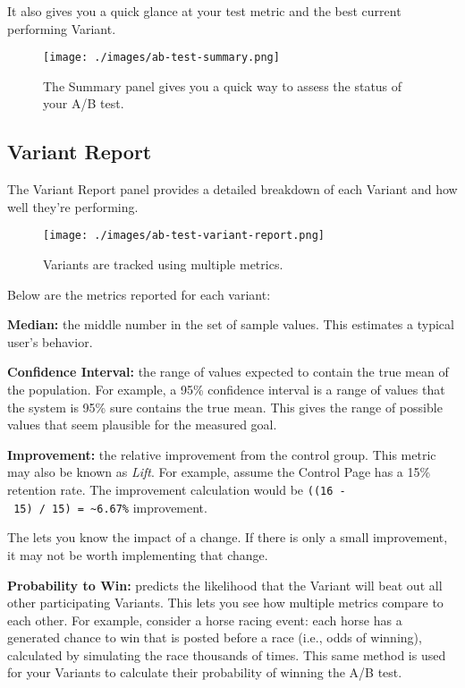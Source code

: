 It also gives you a quick glance at your test metric and the best
current performing Variant.

\begin{figure}
\centering
\texttt{[image: ./images/ab-test-summary.png]}
\caption{The Summary panel gives you a quick way to assess the status of
your A/B test.}
\end{figure}

\subsection{Variant Report}\label{variant-report}

The Variant Report panel provides a detailed breakdown of each Variant
and how well they're performing.

\begin{figure}
\centering
\texttt{[image: ./images/ab-test-variant-report.png]}
\caption{Variants are tracked using multiple metrics.}
\end{figure}

Below are the metrics reported for each variant:

\textbf{Median:} the middle number in the set of sample values. This
estimates a typical user's behavior.

\textbf{Confidence Interval:} the range of values expected to contain
the true mean of the population. For example, a 95\% confidence interval
is a range of values that the system is 95\% sure contains the true
mean. This gives the range of possible values that seem plausible for
the measured goal.

\textbf{Improvement:} the relative improvement from the control group.
This metric may also be known as \emph{Lift}. For example, assume the
Control Page has a 15\% retention rate. The improvement calculation
would be \texttt{((16\ -\ 15)\ /\ 15)\ =\ \textasciitilde{}6.67\%}
improvement.

The lets you know the impact of a change. If there is only a small
improvement, it may not be worth implementing that change.

\textbf{Probability to Win:} predicts the likelihood that the Variant
will beat out all other participating Variants. This lets you see how
multiple metrics compare to each other. For example, consider a horse
racing event: each horse has a generated chance to win that is posted
before a race (i.e., odds of winning), calculated by simulating the race
thousands of times. This same method is used for your Variants to
calculate their probability of winning the A/B test.

